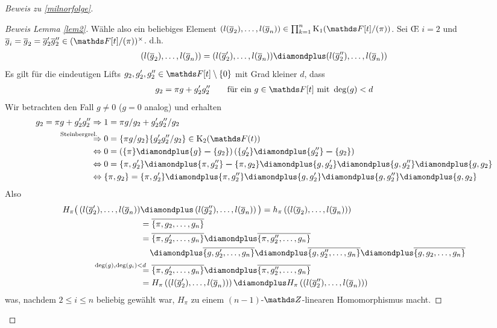\documentclass[ngerman,fontsize=11pt, paper=a4, parskip=half, titlepage=true, toc=bib]{scrartcl}
\begin{document}
\begin{proof}[Beweis zu \ref{milnorfolge}]
\begin{proof}[Beweis Lemma \ref{lem2}]
    Wähle also ein beliebiges Element 
    $\left(l(\ov g_2),\dotsc,l(\ov g_n)\right)\in\prod_{k=1}^n\K_1(\Ftpi)$.
    Sei \OE{} $i=2$ und $\ov g_i=\ov g_2=\ov g_2'\ov g_2''\in(\Ftpi)^\times$.
    d.h. 
    \begin{gather*}
      (l(\ov g_2),\dotsc, l(\ov g_n))
      =(l(\ov g_2'),\dotsc, l(\ov g_n))\p(l(\ov g_2''),\dotsc,l(\ov g_n))
    \end{gather*}
    Es gilt für die eindeutigen Lifts
    $g_2,g_2',g_2''\in\F[t]\setminus\{0\}$ mit Grad kleiner $d$, dass 
    \begin{gather*}
      g_2=\pi g + g_2'g_2''
      \qquad\text{für ein }g\in\F[t]\text{ mit }\deg(g)<d
    \end{gather*}
    Wir betrachten den Fall $g\neq 0$ ($g=0$ analog)
    und erhalten
    \begin{align*}
      g_2=\pi g + g_2'g_2''
      &\Rightarrow
        1 = \pi g/g_2 + g_2'g_2''/g_2\\
      &\overset{\mathllap{\text{Steinbergrel.}}}{\Rightarrow}
        0 = \{\pi g/g_2\}\{g_2'g_2''/g_2\} \in\K_2(\Ft)\\
      &\Leftrightarrow 
        0= \left( \{\pi\}\p \{g\}\m \{g_2\} \right)
        \left( \{g_2'\}\p \{g_2''\}\m \{g_2\}\right)\\
      &\Leftrightarrow 
        0=\{\pi,g_2'\}\p\{\pi,g_2''\}\m \{\pi,g_2\}
        \p\{g,g_2'\}\p\{g,g_2''\}\p\{g,g_2\}\\
      &\Leftrightarrow 
        \{\pi,g_2\}=\{\pi,g_2'\}\p\{\pi,g_2''\}
        \p\{g,g_2'\}\p\{g,g_2''\}\p\{g,g_2\}    
    \end{align*}
    Also
    \begin{align*}
      H_\pi\big(
      \left( l(\ov g_2'),\dotsc,l(\ov g_n)\right)
      &\p \left( l(\ov g_2''),\dotsc,l(\ov g_n) \right)
        \big)
        =h_\pi\left( \left( l(\ov g_2),\dotsc,l(\ov g_n) \right)
        \right)\\
      &=\ov{\{\pi,g_2,\dotsc,g_n\}}\\
      &=\ov{\{\pi,g_2',\dotsc,g_n\}} \p \ov{\{\pi,g_2'',\dotsc,g_n\}}\\
      &\phantom{=~}\p \ov{\{g,g_2',\dotsc,g_n\}}
        \p \ov{\{g,g_2'',\dotsc,g_n\}} 
        \p \ov{\{g,g_2,\dotsc,g_n\}}\\
      &\overset{\mathllap{\deg(g),\deg(g_i)<d}}{=}
        \ov{\{\pi,g_2',\dotsc,g_n\}} \p \ov{\{\pi,g_2'',\dotsc,g_n\}}\\
      &=H_\pi\left(\left(l(\ov g_2'),\dotsc,l(\ov g_n)\right)\right)
        \p H_\pi\left(\left(l(\ov g_2''),\dotsc,l(\ov g_n)\right)\right)     
    \end{align*}
    was, nachdem $2\leq i\leq n$ beliebig gewählt war, $H_\pi$ zu
    einem $(n-1)$-$\Z$-linearen Homomorphismus macht.


\end{proof}
\end{proof}
\end{document}
